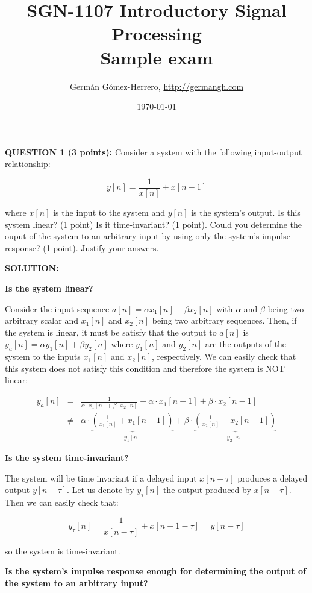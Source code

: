 \documentclass[a4paper,11pt,oneside]{article}
\title{SGN-1107 Introductory Signal Processing\\
Sample exam}
\date{\today}
\author{Germ\'an G\'omez-Herrero, \url{http://germangh.com}}
\begin{document}
\maketitle


\textbf{QUESTION 1 (3 points):}  Consider a system with the following input-output relationship:

\[
y[n] = \frac{1}{x[n]}+x[n-1]
\]

where $x[n]$ is the input to the system and $y[n]$ is the system's output. Is this system linear? (1 point) Is it time-invariant? (1 point). Could you determine the ouput of the system to an arbitrary input by using only the system's impulse response? (1 point). Justify your answers. 

\vspace{1cm}

\textbf{SOLUTION:}

\textbf{Is the system linear?}

Consider the input sequence $a[n]=\alpha x_1[n]+\beta x_2[n]$ with $\alpha$ and $\beta$ being two arbitrary scalar and $x_1[n]$ and $x_2[n]$ being two arbitrary sequences. Then, if the system is linear, it must be satisfy that the output to $a[n]$ is $y_a[n]=\alpha y_1[n] + \beta y_2[n]$ where $y_1[n]$ and $y_2[n]$ are the outputs of the system to the inputs $x_1[n]$ and $x_2[n]$, respectively. We can easily check that this system does not satisfy this condition and therefore the system is NOT linear:

\[
\begin{array}{lll}
y_a[n]&=&\frac{1}{\alpha\cdot x_1[n]+\beta\cdot x_2[n]}+\alpha\cdot x_1[n-1]+\beta\cdot x_2[n-1]\\ &\neq&\alpha\cdot\underbrace{\left(\frac{1}{x_1[n]}+x_1[n-1]\right)}_{y_1[n]}+\beta\cdot\underbrace{\left(\frac{1}{x_2[n]}+x_2[n-1]\right)}_{y_2[n]}
\end{array}
\]

\textbf{Is the system time-invariant?}

The system will be time invariant if a delayed input $x[n-\tau]$ produces a delayed output $y[n-\tau]$. Let us denote by $y_\tau[n]$ the output produced by $x[n-\tau]$. Then we can easily check that:

\[
y_\tau[n] = \frac{1}{x[n-\tau]}+x[n-1-\tau] =y[n-\tau]
\]

so the system is time-invariant.

\textbf{Is the system's impulse response enough for determining the output of the system to an arbitrary input?}
\end{document}
